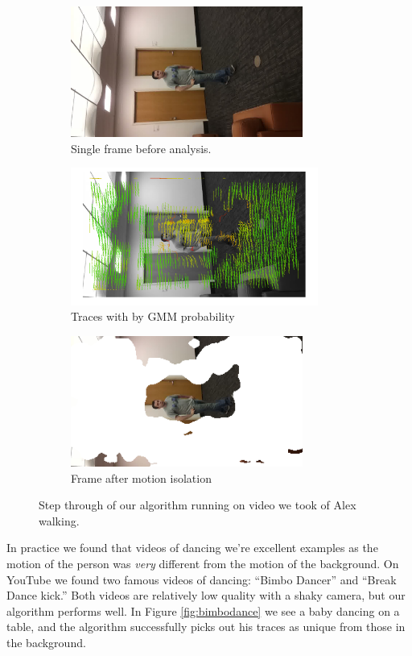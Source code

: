 \begin{figure}[tb]
	\centering
	\begin{subfigure}[b]{0.33\textwidth}
		\centering
		\includegraphics[width=3in,angle=-90]{figs/alex-image30.jpg}
		\caption{Single frame before analysis.}
	\end{subfigure}%
	\begin{subfigure}[b]{0.33\textwidth}
		\centering
		\includegraphics[width=3.2in,angle=-90]{figs/gmm-motion.png}
		\caption{Traces with by GMM probability}
	\end{subfigure}%
	\begin{subfigure}[b]{0.33\textwidth}
		\centering
		\includegraphics[width=3in,angle=-90]{figs/alex30.png}
		\caption{Frame after motion isolation}
	\end{subfigure}%

	\caption{Step through of our algorithm running on video we took of Alex walking.}
	\label{fig:alex-walking}
\end{figure}

In practice we found that videos of dancing we're excellent examples as the
motion of the person was {\it very} different from the motion of the
background.  On YouTube we found two famous videos of dancing: ``Bimbo Dancer''
and ``Break Dance kick.''  Both videos are relatively low quality with a shaky
camera, but our algorithm performs well.  In Figure \ref{fig:bimbodance} we see
a baby dancing on a table, and the algorithm successfully picks out his traces
as unique from those in the background.

